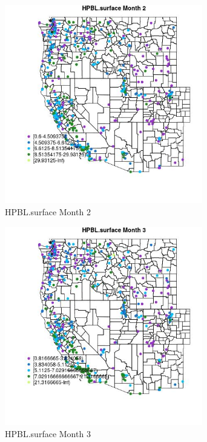 \begin{figure} 
\centering  
\includegraphics[width=0.77\textwidth]{Code_Outputs/ML_input_report_ML_input_PM25_Step5_part_d_de_duplicated_aves_ML_input_MapObsMo2HPBLsurface.jpg} 
\caption{\label{fig:ML_input_report_ML_input_PM25_Step5_part_d_de_duplicated_aves_ML_inputMapObsMo2HPBLsurface}HPBL.surface Month 2} 
\end{figure} 
 

\begin{figure} 
\centering  
\includegraphics[width=0.77\textwidth]{Code_Outputs/ML_input_report_ML_input_PM25_Step5_part_d_de_duplicated_aves_ML_input_MapObsMo3HPBLsurface.jpg} 
\caption{\label{fig:ML_input_report_ML_input_PM25_Step5_part_d_de_duplicated_aves_ML_inputMapObsMo3HPBLsurface}HPBL.surface Month 3} 
\end{figure} 
 


